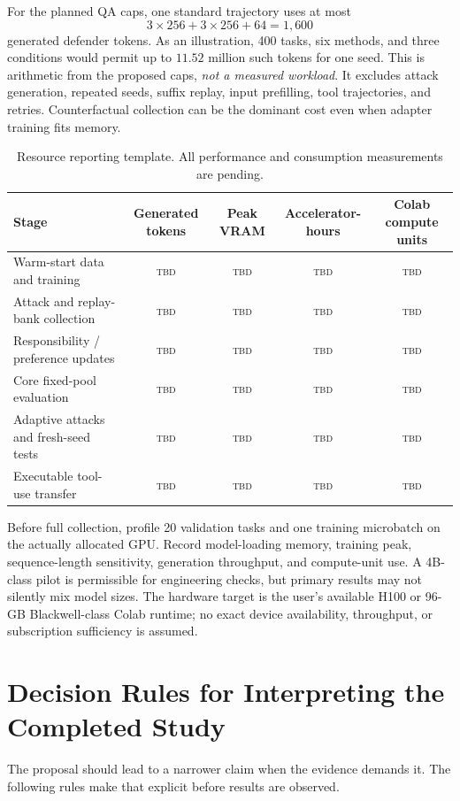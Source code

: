 \documentclass[10pt,twocolumn]{article}
\newcommand{\TBD}{\textsc{tbd}}
\begin{document}
For the planned QA caps, one standard trajectory uses at most
\begin{equation}
 3\times256+3\times256+64=1{,}600
\end{equation}
generated defender tokens. As an illustration, 400 tasks, six methods, and three conditions would permit up to $11.52$ million such tokens for one seed. This is arithmetic from the proposed caps, \emph{not a measured workload}. It excludes attack generation, repeated seeds, suffix replay, input prefilling, tool trajectories, and retries. Counterfactual collection can be the dominant cost even when adapter training fits memory.

\begin{table}[h]
\centering\small
\caption{Resource reporting template. All performance and consumption measurements are pending.}
\label{tab:resources}
\begin{tabularx}{0.95\textwidth}{@{}Xcccc@{}}
\toprule
Stage & Generated tokens & Peak VRAM & Accelerator-hours & Colab compute units \\
\midrule
Warm-start data and training & \TBD & \TBD & \TBD & \TBD \\
Attack and replay-bank collection & \TBD & \TBD & \TBD & \TBD \\
Responsibility / preference updates & \TBD & \TBD & \TBD & \TBD \\
Core fixed-pool evaluation & \TBD & \TBD & \TBD & \TBD \\
Adaptive attacks and fresh-seed tests & \TBD & \TBD & \TBD & \TBD \\
Executable tool-use transfer & \TBD & \TBD & \TBD & \TBD \\
\bottomrule
\end{tabularx}
\end{table}

Before full collection, profile 20 validation tasks and one training microbatch on the actually allocated GPU. Record model-loading memory, training peak, sequence-length sensitivity, generation throughput, and compute-unit use. A 4B-class pilot is permissible for engineering checks, but primary results may not silently mix model sizes. The hardware target is the user's available H100 or 96-GB Blackwell-class Colab runtime; no exact device availability, throughput, or subscription sufficiency is assumed.

\section{Decision Rules for Interpreting the Completed Study}
\label{app:claims}
The proposal should lead to a narrower claim when the evidence demands it. The following rules make that explicit before results are observed.
\end{document}
